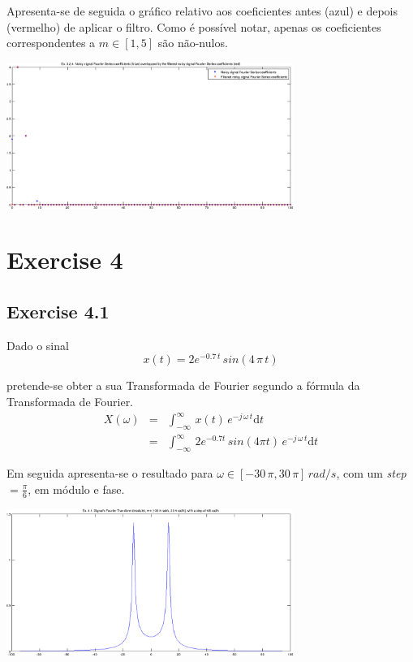 \documentclass[a4paper]{article}
\begin{document}
\noindent Apresenta-se de seguida o gráfico relativo aos coeficientes antes (azul) e depois (vermelho) de aplicar o filtro. Como é possível notar, apenas os coeficientes correspondentes a $m \in [1, 5]$ são não-nulos.
\begin{center}
	\includegraphics[width=0.70\textwidth]{images/ex3_2_4_coeffs.png}
	\label{fig:ex3_2_4_coeffs}
\end{center}

\clearpage
\section{Exercise 4}
\subsection{Exercise 4.1}
\noindent Dado o sinal
\begin{equation}
	x(t) = 2 e^{-0.7 \, t} \, sin(4 \, \pi \, t)
\end{equation}

\noindent pretende-se obter a sua Transformada de Fourier segundo a fórmula da Transformada de Fourier.
\begin{eqnarray}
	X(\omega) & = & \int_{-\infty}^{\infty} \, x(t) \, e ^{-j \, \omega \, t} \mathrm{d}t \\
	& = & \int_{-\infty}^{\infty} \, 2 e^{-0.7 t} \, sin(4 \pi t) \, e^{-j \, \omega \, t} \mathrm{d}t
\end{eqnarray}

\noindent Em seguida apresenta-se o resultado para $\omega \in [-30 \, \pi, 30 \, \pi] \, rad/s$, com um \emph{step} $ = \frac{\pi}{6}$, em módulo e fase.
\begin{center}
	\includegraphics[width=0.70\textwidth]{images/ex_4_1_mod.png}
	\label{fig:ex_4_1_module}
\end{center}
\end{document}
